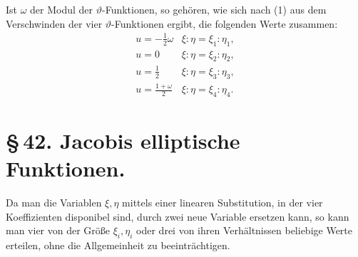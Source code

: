 \documentclass[11pt]{article}
\begin{document}
Ist $\omega$ der Modul der $\vartheta$-Funktionen, so gehören, wie sich nach (1) aus dem Verschwinden der vier $\vartheta$-Funktionen ergibt, die folgenden Werte zusammen:
\begin{equation}
\begin{array}{c|c}
 u=-\frac12\omega & \xi:\eta=\xi_1:\eta_1,\\[0.35em]
 u=0 & \xi:\eta=\xi_2:\eta_2,\\[0.35em]
 u=\frac12 & \xi:\eta=\xi_3:\eta_3,\\[0.35em]
 u=\frac{1+\omega}{2} & \xi:\eta=\xi_4:\eta_4.
\end{array}
\tag{11}
\end{equation}

\section*{\S\,42. Jacobis elliptische Funktionen.}

Da man die Variablen $\xi,\eta$ mittels einer linearen Substitution, in der vier Koeffizienten disponibel sind, durch zwei neue Variable ersetzen kann, so kann man vier von der Größe $\xi_i,\eta_i$ oder drei von ihren Verhältnissen beliebige Werte erteilen, ohne die Allgemeinheit zu beeinträchtigen.
\end{document}
